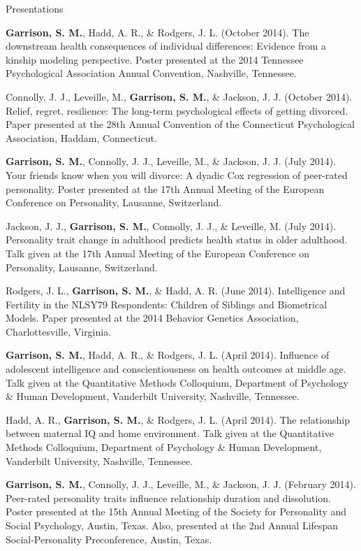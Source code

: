 \documentclass {resume}
\newcommand{\meb}{{\bf Garrison, S. M.}\xspace}
\newlength{\wideitemsep}
\let\olditem\item
\renewcommand{\item}{\setlength{\itemsep}{\wideitemsep}\olditem}
\begin{document}
\begin{rSection}{\textrm{Presentations}}
\begin{etaremune}
\item\meb, Hadd, A. R., \& Rodgers, J. L. (October 2014). The downstream health consequences of individual differences: Evidence from a kinship modeling perspective. Poster presented at the 2014 Tennessee Psychological Association Annual Convention, Nashville, Tennessee.
\item Connolly, J. J., Leveille, M., \meb, \& Jackson, J. J. (October 2014). Relief,  regret,  resilience: The  long-term  psychological  effects  of  getting divorced. Paper presented at the 28th Annual Convention of the Connecticut Psychological Association, Haddam, Connecticut.
\item\meb, Connolly, J. J., Leveille, M., \& Jackson, J. J. (July 2014). Your friends know when you will divorce: A dyadic Cox regression of peer-rated personality. Poster presented at the 17th Annual Meeting of the European Conference on Personality, Lausanne, Switzerland.
\item Jackson, J. J., \meb, Connolly, J. J., \& Leveille, M. (July 2014). Personality trait change in adulthood predicts health status in older adulthood. Talk given at the 17th Annual Meeting of the European Conference on Personality, Lausanne, Switzerland.
\item Rodgers, J. L., \meb, \& Hadd, A. R. (June 2014). Intelligence and Fertility in the NLSY79 Respondents: Children of Siblings and Biometrical Models. Paper presented at the 2014 Behavior Genetics Association, Charlottesville, Virginia. 
\pagestyle{myheadings}
\item\meb, Hadd, A. R., \& Rodgers, J. L. (April 2014). Influence of adolescent intelligence and conscientiousness on health outcomes at middle age. Talk given at the Quantitative Methods Colloquium, Department of Psychology \& Human Development, Vanderbilt University, Nashville, Tennessee.
\item Hadd, A. R., \meb, \& Rodgers, J. L. (April 2014). The relationship between maternal IQ and home environment. Talk given at the Quantitative Methods Colloquium, Department of Psychology \& Human Development, Vanderbilt University, Nashville, Tennessee.%
\item\meb, Connolly, J. J., Leveille, M., \& Jackson, J. J. (February 2014). Peer-rated personality traits influence relationship duration and dissolution. Poster presented at the 15th Annual Meeting of the Society for Personality and Social Psychology, Austin, Texas. Also, presented at the 2nd Annual Lifespan Social-Personality  Preconference, Austin, Texas.

\end{etaremune}
\end{rSection}
\end{document}
